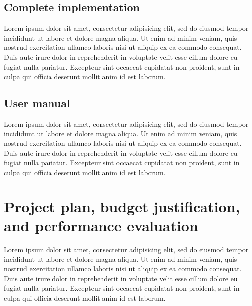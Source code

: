\documentclass[12pt,a4paper]{article}
\begin{document}
\subsection{Complete implementation}
Lorem ipsum dolor sit amet, consectetur adipisicing elit, sed do eiusmod tempor incididunt ut labore et dolore magna aliqua. Ut enim ad minim veniam, quis nostrud exercitation ullamco laboris nisi ut aliquip ex ea commodo consequat. Duis aute irure dolor in reprehenderit in voluptate velit esse cillum dolore eu fugiat nulla pariatur. Excepteur sint occaecat cupidatat non proident, sunt in culpa qui officia deserunt mollit anim id est laborum.

\subsection{User manual}
Lorem ipsum dolor sit amet, consectetur adipisicing elit, sed do eiusmod tempor incididunt ut labore et dolore magna aliqua. Ut enim ad minim veniam, quis nostrud exercitation ullamco laboris nisi ut aliquip ex ea commodo consequat. Duis aute irure dolor in reprehenderit in voluptate velit esse cillum dolore eu fugiat nulla pariatur. Excepteur sint occaecat cupidatat non proident, sunt in culpa qui officia deserunt mollit anim id est laborum.

\section{Project plan, budget justification, and performance evaluation}
Lorem ipsum dolor sit amet, consectetur adipisicing elit, sed do eiusmod tempor incididunt ut labore et dolore magna aliqua. Ut enim ad minim veniam, quis nostrud exercitation ullamco laboris nisi ut aliquip ex ea commodo consequat. Duis aute irure dolor in reprehenderit in voluptate velit esse cillum dolore eu fugiat nulla pariatur. Excepteur sint occaecat cupidatat non proident, sunt in culpa qui officia deserunt mollit anim id est laborum. \\
\end{document}
